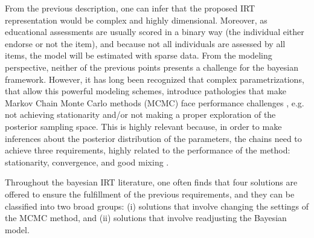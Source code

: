 From the previous description, one can infer that the proposed IRT representation would be complex and highly dimensional. Moreover, as educational assessments are usually scored in a binary way (the individual either endorse or not the item), and because not all individuals are assessed by all items, the model will be estimated with sparse data. From the modeling perspective, neither of the previous points presents a challenge for the bayesian framework. However, it has long been recognized that complex parametrizations, that allow this powerful modeling schemes, introduce pathologies that make Markov Chain Monte Carlo methods (MCMC)  face performance challenges \cite{Gelfand_et_al_1995, Gelfand_et_al_1996, Papaspiliopoulos_et_al_2003, Papaspiliopoulos_et_al_2007, Betancourt_et_al_2013}, e.g. not achieving stationarity and/or not making a proper exploration of the posterior sampling space. This is highly relevant because, in order to make inferences about the posterior distribution of the parameters, the chains need to achieve three requirements, highly related to the performance of the method: stationarity, convergence, and good mixing \cite{McElreath_2020}.

Throughout the bayesian IRT literature, one often finds that four solutions are offered to ensure the fulfillment of the previous requirements, and they can be classified into two broad groups: (i) solutions that involve changing the settings of the MCMC method, and (ii) solutions that involve readjusting the Bayesian model. 

